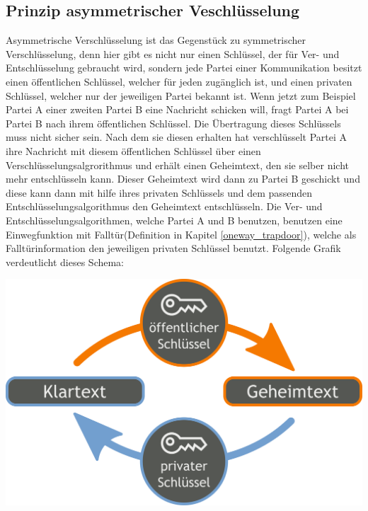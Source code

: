\documentclass[a4paper,12pt,titlepage]{article}
\begin{document}
\subsection{Prinzip asymmetrischer Veschlüsselung}\label{asymm:prinzip}
Asymmetrische Verschlüsselung ist das Gegenstück zu symmetrischer Verschlüsselung, denn hier gibt es nicht nur einen Schlüssel, der für Ver- und Entschlüsselung gebraucht wird, sondern jede Partei einer Kommunikation besitzt einen öffentlichen Schlüssel, welcher für jeden zugänglich ist, und einen privaten Schlüssel, welcher nur der jeweiligen Partei bekannt ist. Wenn jetzt zum Beispiel Partei A einer zweiten Partei B eine Nachricht schicken will, fragt Partei A bei Partei B nach ihrem öffentlichen Schlüssel. Die Übertragung dieses Schlüssels muss nicht sicher sein. Nach dem sie diesen erhalten hat verschlüsselt Partei A ihre Nachricht mit diesem öffentlichen Schlüssel über einen Verschlüsselungsalgrorithmus und erhält einen Geheimtext, den sie selber nicht mehr entschlüsseln kann. Dieser Geheimtext wird dann zu Partei B geschickt und diese kann dann mit hilfe ihres privaten Schlüssels und dem passenden Entschlüsselungsalgorithmus den Geheimtext entschlüsseln. Die Ver- und Entschlüsselungsalgorithmen, welche Partei A und B benutzen, benutzen eine Einwegfunktion mit Falltür(Definition in Kapitel \ref{oneway_trapdoor}), welche als Falltürinformation den jeweiligen privaten Schlüssel benutzt. \newline Folgende Grafik verdeutlicht dieses Schema:
\begin{center}
\includegraphics[scale=0.2]{asymm_shema.png} %
\end{center}
\end{document}
